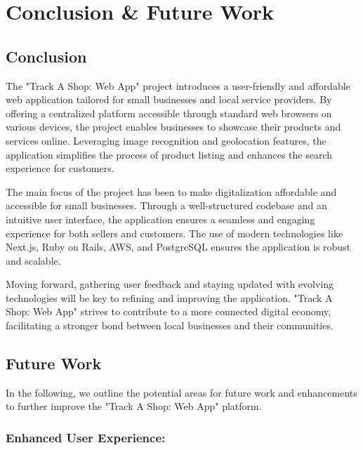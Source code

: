 
\chapter{Conclusion \& Future Work} %

\label{Chapter5} %



\section{Conclusion}
The "Track A Shop: Web App" project introduces a user-friendly and affordable web application tailored for small businesses and local service providers. By offering a centralized platform accessible through standard web browsers on various devices, the project enables businesses to showcase their products and services online. Leveraging image recognition and geolocation features, the application simplifies the process of product listing and enhances the search experience for customers.

The main focus of the project has been to make digitalization affordable and accessible for small businesses. Through a well-structured codebase and an intuitive user interface, the application ensures a seamless and engaging experience for both sellers and customers. The use of modern technologies like Next.js, Ruby on Rails, AWS, and PostgreSQL ensures the application is robust and scalable.

Moving forward, gathering user feedback and staying updated with evolving technologies will be key to refining and improving the application. "Track A Shop: Web App" strives to contribute to a more connected digital economy, facilitating a stronger bond between local businesses and their communities.


\section{Future Work}
In the following, we outline the potential areas for future work and enhancements to further improve the "Track A Shop: Web App" platform.

\subsection{Enhanced User Experience:}


